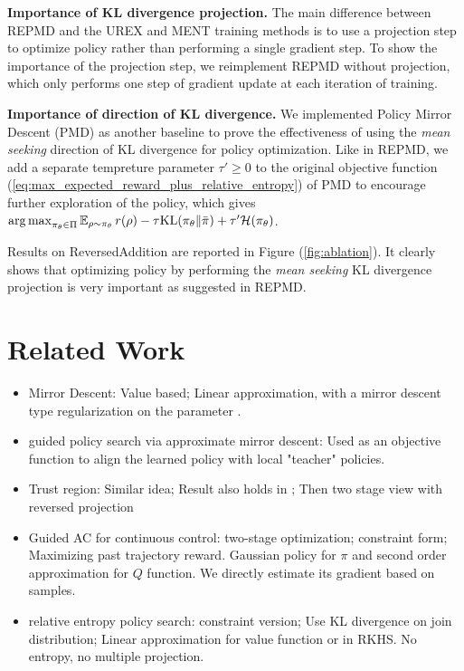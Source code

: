 \documentclass{article} %
\begin{document}
\textbf{Importance of KL divergence projection.} The main difference between REPMD and the UREX and MENT training methods is to use a projection step to optimize policy rather than performing a single gradient step. To show the importance of the projection step, we reimplement REPMD without projection, which only performs one step of gradient update at each iteration of training. 

\textbf{Importance of direction of KL divergence.} We implemented Policy Mirror Descent (PMD) as another baseline to prove the effectiveness of using the \emph{mean seeking} direction of KL divergence for policy optimization. Like in REPMD, we add a separate tempreture parameter $\tau'\geq 0$ to the original objective function (\ref{eq:max_expected_reward_plus_relative_entropy}) of PMD to encourage further exploration of the policy, which gives $\operatorname*{arg\,max}_{\pi_\theta \in \Pi}{ \operatorname*{\mathbb{E}}_{\rho \sim \pi_\theta}{  r(\rho)  - \tau \text{KL}(\pi_\theta \| \bar{\pi}) } + \tau'\mathcal{H}(\pi_\theta) }$.

Results on ReversedAddition are reported in Figure (\ref{fig:ablation}). It clearly shows that optimizing policy by performing the \emph{mean seeking} KL divergence projection is very important as suggested in REPMD. 

\section{Related Work}
\label{sec:related_work}

\begin{itemize}
	\item Mirror Descent: Value based; Linear approximation, with a mirror descent type regularization on the parameter \citep{liu2015finite,thomas2013projected,mahadevan2012sparse}. 
	\item guided policy search via approximate mirror descent: Used as an objective function to align the learned policy with local "teacher" policies. \citep{montgomery2016guided}
	\item Trust region: Similar idea; Result also holds in ; Then two stage view with reversed projection \cite{schulman2015trust}
	\item Guided AC for continuous control: two-stage optimization; constraint form; Maximizing past trajectory reward. Gaussian policy for $\pi$ and second order approximation for $Q$ function. We directly estimate its gradient based on samples. \citep{tangkaratt2017guide}
	\item relative entropy policy search: constraint version; Use KL divergence on join distribution; Linear approximation for value function or in RKHS. No entropy, no multiple projection. \citep{peters2010relative,van2015learning}
\end{itemize}
\end{document}
